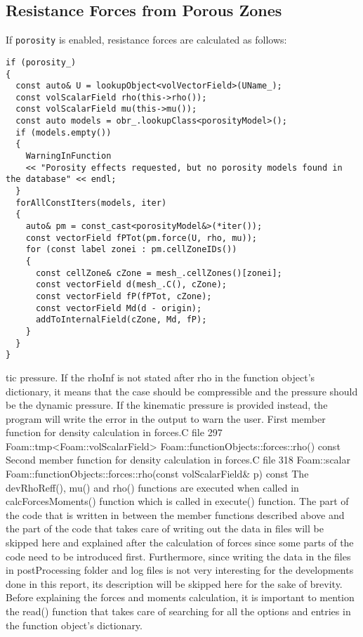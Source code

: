 \subsection*{Resistance Forces from Porous Zones}
If \texttt{porosity} is enabled, resistance forces are calculated as follows:
\begin{lstlisting}
if (porosity_)
{
  const auto& U = lookupObject<volVectorField>(UName_);
  const volScalarField rho(this->rho());
  const volScalarField mu(this->mu());
  const auto models = obr_.lookupClass<porosityModel>();
  if (models.empty())
  {
    WarningInFunction
    << "Porosity effects requested, but no porosity models found in the database" << endl;
  }
  forAllConstIters(models, iter)
  {
    auto& pm = const_cast<porosityModel&>(*iter());
    const vectorField fPTot(pm.force(U, rho, mu));
    for (const label zonei : pm.cellZoneIDs())
    {
      const cellZone& cZone = mesh_.cellZones()[zonei];
      const vectorField d(mesh_.C(), cZone);
      const vectorField fP(fPTot, cZone);
      const vectorField Md(d - origin);
      addToInternalField(cZone, Md, fP);
    }
  }
}
\end{lstlisting}
tic pressure. If the rhoInf is not stated after rho
in the function object’s dictionary, it means that the case should be compressible and the pressure
should be the dynamic pressure. If the kinematic pressure is provided instead, the program will
write the error in the output to warn the user.
First member function for density calculation in forces.C file
297 Foam::tmp<Foam::volScalarField> Foam::functionObjects::forces::rho() const
Second member function for density calculation in forces.C file
318 Foam::scalar Foam::functionObjects::forces::rho(const volScalarField\& p) const
The devRhoReff(), mu() and rho() functions are executed when called in calcForcesMoments()
function which is called in execute() function.
The part of the code that is written in between the member functions described above and the
part of the code that takes care of writing out the data in files will be skipped here and explained
after the calculation of forces since some parts of the code need to be introduced first. Furthermore,
since writing the data in the files in postProcessing folder and log files is not very interesting for
the developments done in this report, its description will be skipped here for the sake of brevity.
Before explaining the forces and moments calculation, it is important to mention the read()
function that takes care of searching for all the options and entries in the function object’s dictionary.

